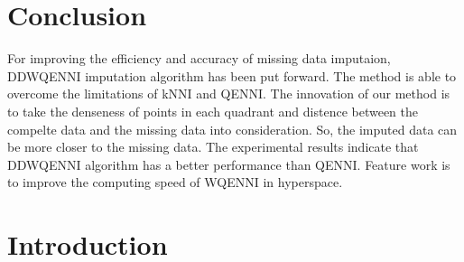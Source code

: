 \documentclass[print]{jicspack}
\begin{document}
\section{Conclusion}
For improving the efficiency and accuracy of missing data imputaion, DDWQENNI imputation algorithm has been put forward. The method is able to overcome the limitations of kNNI and QENNI. The innovation of our method is to take the denseness of points in each quadrant and distence between the compelte data and the missing data into consideration. So, the imputed data can be more closer to the missing data. The experimental results indicate that DDWQENNI algorithm has a better performance than QENNI. Feature work is to improve the computing speed of WQENNI in hyperspace.

\section{Introduction}
\label{Maintext}
\end{document}

